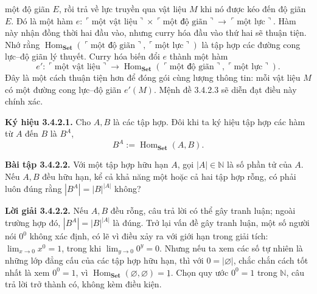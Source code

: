 một độ giãn $E$, rồi trả về lực truyền qua vật liệu $M$ khi nó được kéo đến độ giãn $E$. Đó là một hàm $e:\ulcorner\text{một vật liệu}\urcorner\times\ulcorner\text{một độ giãn}\urcorner\to\ulcorner\text{một lực}\urcorner$. Hàm này nhận đồng thời hai đầu vào, nhưng curry hóa đầu vào thứ hai sẽ thuận tiện. Nhớ rằng $\operatorname{Hom}_{\mathbf{Set}}(\ulcorner\text{một độ giãn}\urcorner,\ulcorner\text{một lực}\urcorner)$ là tập hợp các đường cong lực--độ giãn lý thuyết. Curry hóa biến đổi $e$ thành một hàm
\[e':\ulcorner\text{một vật liệu}\urcorner\to\operatorname{Hom}_{\mathbf{Set}}(\ulcorner\text{một độ giãn}\urcorner,\ulcorner\text{một lực}\urcorner).\]
Đây là một cách thuận tiện hơn để đóng gói cùng lượng thông tin: mỗi vật liệu $M$ có một đường cong lực--độ giãn $e'(M)$. Mệnh đề 3.4.2.3 sẽ diễn đạt điều này chính xác.

\noindent\textbf{Ký hiệu 3.4.2.1.} Cho $A,B$ là các tập hợp. Đôi khi ta ký hiệu tập hợp các hàm từ $A$ đến $B$ là $B^A$,
\begin{equation*}B^A:=\operatorname{Hom}_{\mathbf{Set}}(A,B).\tag{3.21}\end{equation*}

\noindent\textbf{Bài tập 3.4.2.2.} Với một tập hợp hữu hạn $A$, gọi $|A|\in\mathbb N$ là số phần tử của $A$. Nếu $A,B$ đều hữu hạn, kể cả khả năng một hoặc cả hai tập hợp rỗng, có phải luôn đúng rằng $|B^A|=|B|^{|A|}$ không?

\noindent\textbf{Lời giải 3.4.2.2.} Nếu $A,B$ đều rỗng, câu trả lời có thể gây tranh luận; ngoài trường hợp đó, $|B^A|=|B|^{|A|}$ là đúng. Trở lại vấn đề gây tranh luận, một số người nói $0^0$ không xác định, có lẽ vì điều xảy ra với giới hạn trong giải tích: $\lim_{x\to0}x^0=1$, trong khi $\lim_{y\to0}0^y=0$. Nhưng nếu ta xem các số tự nhiên là những lớp đẳng cấu của các tập hợp hữu hạn, thì với $0=|\varnothing|$, chắc chắn cách tốt nhất là xem $0^0=1$, vì $\operatorname{Hom}_{\mathbf{Set}}(\varnothing,\varnothing)=\underline1$. Chọn quy ước $0^0=1$ trong $\mathbb N$, câu trả lời trở thành có, không kèm điều kiện.

